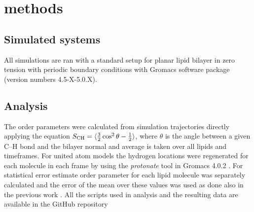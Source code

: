 \documentclass[pre,aps,floatfix,authordate1-4,twocolumn]{revtex4-1}
\begin{document}
\section{methods}

\subsection{Simulated systems}
All simulations are ran with a standard setup for planar lipid bilayer in zero tension
with periodic boundary conditions with Gromacs software package (version numbers 4.5-X-5.0.X).




\subsection{Analysis}
The order parameters were calculated from simulation trajectories directly applying the equation
$S_{{\rm CH}}=\langle \frac{3}{2}  \cos^2 \theta-\frac{1}{2} \rangle$,
where $\theta$ is the angle between a given C--H bond and the bilayer normal and average is taken
over all lipids and timeframes. For united atom models the hydrogen locations
were regenerated for each molecule in each frame by using the {\it protonate} tool in 
Gromacs 4.0.2 \cite{gromacsMANUAL402}. For statistical error estimate order parameter
for each lipid molecule was separately calculated and the error of the mean over these 
values was used as done also in the previous work \cite{botan15}.
All the scripts used in analysis and the resulting data are available in the GitHub repository \cite{githubIONpaper}
\end{document}
